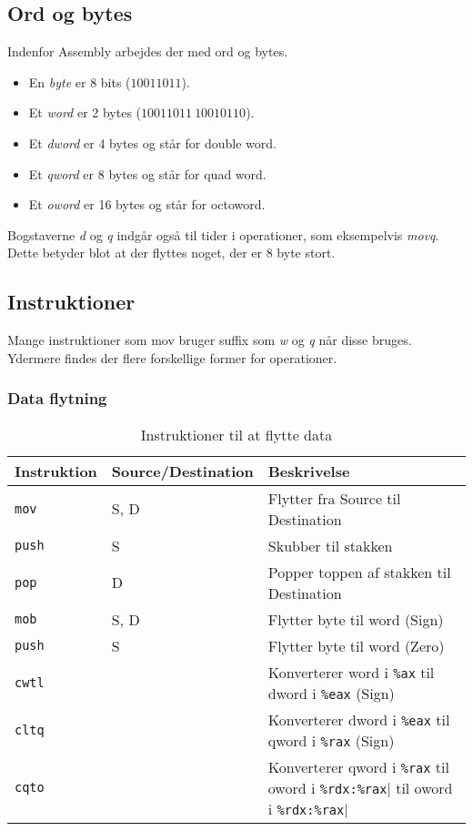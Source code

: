 \subsection{Ord og bytes}
Indenfor Assembly arbejdes der med ord og bytes.
\begin{itemize}
    \item En \textit{byte} er 8 bits ($10011011$).
    \item Et \textit{word} er 2 bytes ($10011011\:10010110$).
    \item Et \textit{dword} er 4 bytes og står for double word.
    \item Et \textit{qword} er 8 bytes og står for quad word.
    \item Et \textit{oword} er 16 bytes og står for octoword.
\end{itemize}
Bogstaverne \textit{d} og \textit{q} indgår også til tider i operationer, som eksempelvis \textit{movq}.
Dette betyder blot at der flyttes noget, der er 8 byte stort.
\subsection{Instruktioner}
Mange instruktioner som mov bruger suffix som \textit{w} og \textit{q} når disse bruges.
Ydermere findes der flere forskellige former for operationer.
\subsubsection{Data flytning}
\begin{table}[h!]
    \centering
    \begin{tabular}{ll|l}
        Instruktion&Source/Destination&Beskrivelse\\\hline
        \verb|mov|&S, D&Flytter fra Source til Destination\\
        \verb|push|&S&Skubber til stakken\\
        \verb|pop|&D&Popper toppen af stakken til Destination\\\hline
        \verb|mob|&S, D&Flytter byte til word (Sign)\\
        \verb|push|&S&Flytter byte til word (Zero)\\\hline
        \verb|cwtl|&&Konverterer word i \verb|%ax| til dword i \verb|%eax| (Sign)\\
        \verb|cltq|&&Konverterer dword i \verb|%eax| til qword i \verb|%rax| (Sign)\\
        \verb|cqto|&&Konverterer qword i \verb|%rax| til oword i \verb|%rdx:%rax|
    \end{tabular}
    \caption{Instruktioner til at flytte data}
\end{table}

